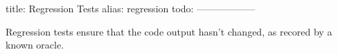 title: Regression Tests
alias: regression
todo:
------------------

Regression tests ensure that the code output hasn't changed, as recored by a known oracle.
